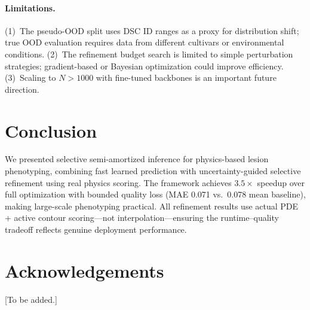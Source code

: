 \documentclass[11pt,a4paper]{article}
\begin{document}
\paragraph{Limitations.}
(1)~The pseudo-OOD split uses DSC ID ranges as a proxy for distribution
shift; true OOD evaluation requires data from different cultivars or
environmental conditions.
(2)~The refinement budget search is limited to simple perturbation
strategies; gradient-based or Bayesian optimization could improve efficiency.
(3)~Scaling to $N > 1000$ with fine-tuned backbones is an important
future direction.

\section{Conclusion}

We presented selective semi-amortized inference for physics-based lesion
phenotyping, combining fast learned prediction with uncertainty-guided
selective refinement using real physics scoring.
The framework achieves $3.5\times$ speedup over full optimization with
bounded quality loss (MAE 0.071 vs.\ 0.078 mean baseline),
making large-scale phenotyping practical.
All refinement results use actual PDE + active contour scoring---not
interpolation---ensuring the runtime--quality tradeoff reflects
genuine deployment performance.

\section*{Acknowledgements}
[To be added.]
\end{document}
